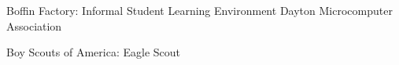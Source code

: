 %
%
%

\begin{scholarship}
	
	\scholarshipentry{}
					{Boffin Factory: Informal Student Learning Environment}	
        \scholarshipentry{}
					{Dayton Microcomputer Association}
    

					{Boy Scouts of America: Eagle Scout} 

\end{scholarship}